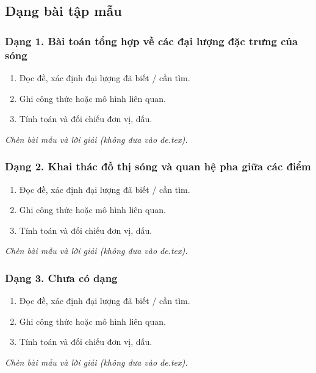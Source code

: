 

\subsection{Dạng bài tập mẫu}
\subsubsection{Dạng 1. Bài toán tổng hợp về các đại lượng đặc trưng của sóng}
\begin{phuongphap}
\begin{enumerate}
\item Đọc đề, xác định đại lượng đã biết / cần tìm.
\item Ghi công thức hoặc mô hình liên quan.
\item Tính toán và đối chiếu đơn vị, dấu.
\end{enumerate}
\end{phuongphap}
\begin{vidumau}
\textit{Chèn bài mẫu và lời giải (không đưa vào de.tex).}
\end{vidumau}

\subsubsection{Dạng 2. Khai thác đồ thị sóng và quan hệ pha giữa các điểm}
\begin{phuongphap}
\begin{enumerate}
\item Đọc đề, xác định đại lượng đã biết / cần tìm.
\item Ghi công thức hoặc mô hình liên quan.
\item Tính toán và đối chiếu đơn vị, dấu.
\end{enumerate}
\end{phuongphap}
\begin{vidumau}
\textit{Chèn bài mẫu và lời giải (không đưa vào de.tex).}
\end{vidumau}

\subsubsection{Dạng 3. Chưa có dạng}
\begin{phuongphap}
\begin{enumerate}
\item Đọc đề, xác định đại lượng đã biết / cần tìm.
\item Ghi công thức hoặc mô hình liên quan.
\item Tính toán và đối chiếu đơn vị, dấu.
\end{enumerate}
\end{phuongphap}
\begin{vidumau}
\textit{Chèn bài mẫu và lời giải (không đưa vào de.tex).}
\end{vidumau}

